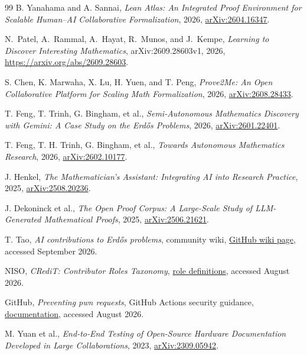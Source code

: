 \documentclass[10pt]{article}
\begin{document}
\begin{thebibliography}{99}
B. Yanahama and A. Sannai, \emph{Lean Atlas: An Integrated Proof Environment
for Scalable Human--AI Collaborative Formalization}, 2026,
\href{https://arxiv.org/abs/2604.16347}{arXiv:2604.16347}.

N.~Patel, A.~Rammal, A.~Hayat, R.~Munos, and J.~Kempe,
\emph{Learning to Discover Interesting Mathematics}, arXiv:2609.28603v1,
2026, \url{https://arxiv.org/abs/2609.28603}.

S. Chen, K. Marwaha, X. Lu, H. Yuen, and T. Peng, \emph{Prove2Me: An Open
Collaborative Platform for Scaling Math Formalization}, 2026,
\href{https://arxiv.org/abs/2608.28433}{arXiv:2608.28433}.

T. Feng, T. Trinh, G. Bingham, et al., \emph{Semi-Autonomous Mathematics
Discovery with Gemini: A Case Study on the Erd\H{o}s Problems}, 2026,
\href{https://arxiv.org/abs/2601.22401}{arXiv:2601.22401}.

T. Feng, T. H. Trinh, G. Bingham, et al., \emph{Towards Autonomous
Mathematics Research}, 2026,
\href{https://arxiv.org/abs/2602.10177}{arXiv:2602.10177}.

J. Henkel, \emph{The Mathematician's Assistant: Integrating AI into Research
Practice}, 2025,
\href{https://arxiv.org/abs/2508.20236}{arXiv:2508.20236}.

J. Dekoninck et al., \emph{The Open Proof Corpus: A Large-Scale Study of
LLM-Generated Mathematical Proofs}, 2025,
\href{https://arxiv.org/abs/2506.21621}{arXiv:2506.21621}.

T. Tao, \emph{AI contributions to Erd\H{o}s problems}, community wiki,
\href{https://github.com/teorth/erdosproblems/wiki/AI-contributions-to-Erd%C5%91s-problems}{GitHub wiki page},
accessed September 2026.

NISO, \emph{CRediT: Contributor Roles Taxonomy},
\href{https://credit.niso.org/contributor-roles-defined/}{role definitions},
accessed August 2026.

GitHub, \emph{Preventing pwn requests}, GitHub Actions security guidance,
\href{https://docs.github.com/en/actions/reference/security/secure-use}{documentation},
accessed August 2026.

M. Yuan et al., \emph{End-to-End Testing of Open-Source Hardware Documentation
Developed in Large Collaborations}, 2023,
\href{https://arxiv.org/abs/2309.05942}{arXiv:2309.05942}.

\end{thebibliography}
\end{document}

